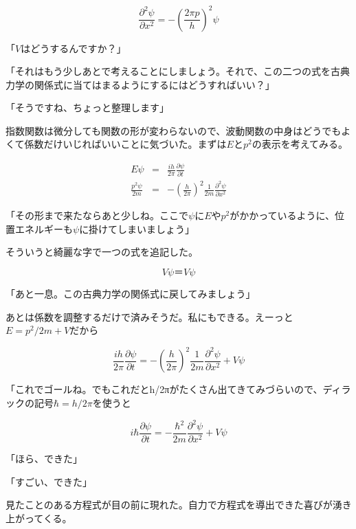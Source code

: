 \documentclass[a4paper,dvipdfmx,12pt]{jsarticle}
\begin{document}
\begin{equation}
\frac{\partial^2\psi}{\partial x^2} = -\left(\frac{2\pi p}{h}\right)^2 \psi
\end{equation}

「$V$はどうするんですか？」

「それはもう少しあとで考えることにしましょう。それで、この二つの式を古典力学の関係式に当てはまるようにするにはどうすればいい？」

「そうですね、ちょっと整理します」

指数関数は微分しても関数の形が変わらないので、波動関数の中身はどうでもよくて係数だけいじればいいことに気づいた。まずは$E$と$p^2$の表示を考えてみる。

\begin{eqnarray}
E\psi&=&\frac{ih}{2\pi}\frac{\partial\psi}{\partial t} \\
\frac{p^2\psi}{2m}&=&-\left(\frac{h}{2\pi}\right)^2\frac{1}{2m}\frac{\partial^2\psi}{\partial x^2}
\end{eqnarray}

「その形まで来たならあと少しね。ここで$\psi$に$E$や$p^2$がかかっているように、位置エネルギーも$\psi$に掛けてしまいましょう」

そういうと綺麗な字で一つの式を追記した。

\begin{equation}
V\psi＝V\psi
\end{equation}

「あと一息。この古典力学の関係式に戻してみましょう」


あとは係数を調整するだけで済みそうだ。私にもできる。えーっと$E=p^2/2m+V$だから

\begin{equation}
\frac{ih}{2\pi}\frac{\partial\psi}{\partial t} = -\left(\frac{h}{2\pi}\right)^2 \frac{1}{2m} \frac{\partial^2\psi}{\partial x^2}+ V\psi
\end{equation}


「これでゴールね。でもこれだとh/2πがたくさん出てきてみづらいので、ディラックの記号$\hbar=h/2\pi$を使うと

\begin{equation}
i\hbar \frac{\partial\psi}{\partial t} = -\frac{\hbar^2}{2m} \frac{\partial^2\psi}{\partial x^2}+ V\psi
\end{equation}

「ほら、できた」

「すごい、できた」

見たことのある方程式が目の前に現れた。自力で方程式を導出できた喜びが湧き上がってくる。
\end{document}
